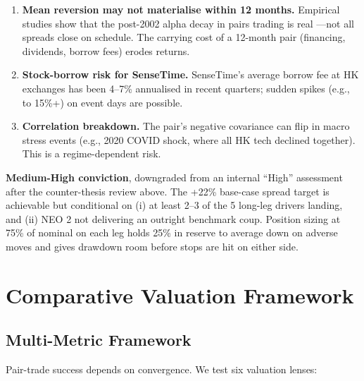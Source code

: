 \documentclass[11pt,a4paper]{article}
\begin{document}
\begin{enumerate}
\item \textbf{Mean reversion may not materialise within 12 months.} Empirical studies show that the post-2002 alpha decay in pairs trading is real \cite{gatev2006pairs}—not all spreads close on schedule. The carrying cost of a 12-month pair (financing, dividends, borrow fees) erodes returns.
\item \textbf{Stock-borrow risk for SenseTime.} SenseTime's average borrow fee at HK exchanges has been 4--7\% annualised in recent quarters; sudden spikes (e.g., to 15\%+) on event days are possible.
\item \textbf{Correlation breakdown.} The pair's negative covariance can flip in macro stress events (e.g., 2020 COVID shock, where all HK tech declined together). This is a regime-dependent risk.
\end{enumerate}

\begin{riskbox}
\textbf{Medium-High conviction}, downgraded from an internal ``High'' assessment after the counter-thesis review above. The +22\% base-case spread target is achievable but conditional on (i) at least 2--3 of the 5 long-leg drivers landing, and (ii) NEO 2 not delivering an outright benchmark coup. Position sizing at 75\% of nominal on each leg holds 25\% in reserve to average down on adverse moves and gives drawdown room before stops are hit on either side.
\end{riskbox}

\newpage
\section{Comparative Valuation Framework}

\subsection{Multi-Metric Framework}

Pair-trade success depends on convergence. We test six valuation lenses:
\end{document}
